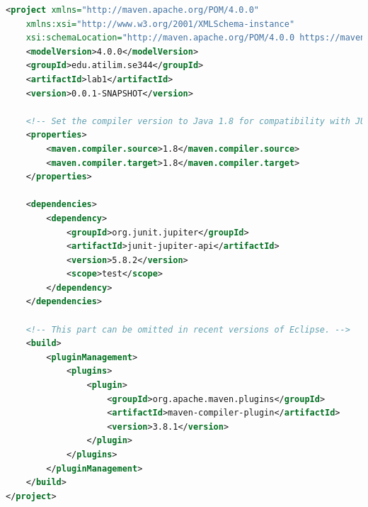 \begin{minipage}{\textwidth}
    \begin{lstlisting}[language=XML,caption={pom.xml file for future exercises.},label=lst:pom-future]
<project xmlns="http://maven.apache.org/POM/4.0.0"
    xmlns:xsi="http://www.w3.org/2001/XMLSchema-instance"
    xsi:schemaLocation="http://maven.apache.org/POM/4.0.0 https://maven.apache.org/xsd/maven-4.0.0.xsd">
    <modelVersion>4.0.0</modelVersion>
    <groupId>edu.atilim.se344</groupId>
    <artifactId>lab1</artifactId>
    <version>0.0.1-SNAPSHOT</version>
    
    <!-- Set the compiler version to Java 1.8 for compatibility with JUnit. -->
    <properties>
        <maven.compiler.source>1.8</maven.compiler.source>
        <maven.compiler.target>1.8</maven.compiler.target>
    </properties>

    <dependencies>
        <dependency>
            <groupId>org.junit.jupiter</groupId>
            <artifactId>junit-jupiter-api</artifactId>
            <version>5.8.2</version>
            <scope>test</scope>
        </dependency>
    </dependencies>

    <!-- This part can be omitted in recent versions of Eclipse. -->
    <build>
        <pluginManagement>
            <plugins>
                <plugin>
                    <groupId>org.apache.maven.plugins</groupId>
                    <artifactId>maven-compiler-plugin</artifactId>
                    <version>3.8.1</version>
                </plugin>
            </plugins>
        </pluginManagement>
    </build>
</project>
    \end{lstlisting}
\end{minipage}
